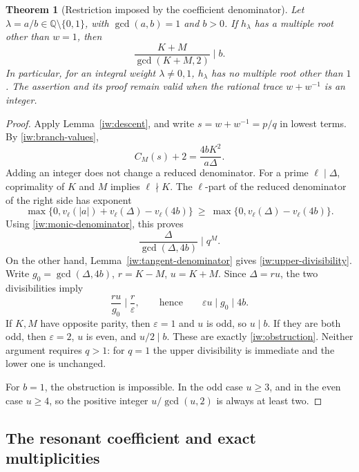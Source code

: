 \documentclass[11pt,a4paper]{article}
\newtheorem{theorem}{Theorem}[section]
\theoremstyle{definition}
\theoremstyle{remark}
\begin{document}
\begin{theorem}[Restriction imposed by the coefficient denominator]
\label{iw:denominator-obstruction}
Let \(\lambda=a/b\in\mathbb Q\setminus\{0,1\}\), with
\(\gcd(a,b)=1\) and \(b>0\). If \(h_\lambda\) has a multiple root
other than \(w=1\), then
\begin{equation}\label{iw:obstruction}
 \boxed{\frac{K+M}{\gcd(K+M,2)}\mid b.}
\end{equation}
In particular, for an integral weight \(\lambda\ne0,1\),
\(h_\lambda\) has no multiple root other than \(1\).
The assertion and its proof remain valid when the rational trace
\(w+w^{-1}\) is an integer.
\end{theorem}

\begin{proof}
Apply Lemma~\ref{iw:descent}, and write \(s=w+w^{-1}=p/q\) in
lowest terms. By \eqref{iw:branch-values},
\[
 C_M(s)+2=\frac{4bK^2}{a\Delta}.
\]
Adding an integer does not change a reduced denominator.
For a prime \(\ell\mid\Delta\), coprimality of \(K\) and \(M\)
implies \(\ell\nmid K\). The \(\ell\)-part of the reduced
denominator of the right side has exponent
\[
 \max\{0,v_\ell(|a|)+v_\ell(\Delta)-v_\ell(4b)\}
 \ \ge\ \max\{0,v_\ell(\Delta)-v_\ell(4b)\}.
\]
Using \eqref{iw:monic-denominator}, this proves
\begin{equation}\label{iw:lower-divisibility}
 \frac{\Delta}{\gcd(\Delta,4b)}\mid q^M.
\end{equation}
On the other hand, Lemma~\ref{iw:tangent-denominator} gives
\eqref{iw:upper-divisibility}. Write
\(g_0=\gcd(\Delta,4b)\), \(r=K-M\), \(u=K+M\). Since \(\Delta=ru\),
the two divisibilities imply
\[
 \frac{ru}{g_0}\mid\frac r\varepsilon,
 \qquad\text{hence}\qquad
 \varepsilon u\mid g_0\mid4b.
\]
If \(K,M\) have opposite parity, then \(\varepsilon=1\) and
\(u\) is odd, so \(u\mid b\). If they are both odd, then
\(\varepsilon=2\), \(u\) is even, and \(u/2\mid b\).
These are exactly \eqref{iw:obstruction}.
Neither argument requires \(q>1\): for \(q=1\) the upper
divisibility is immediate and the lower one is unchanged.

For \(b=1\), the obstruction is impossible. In the odd case
\(u\ge3\), and in the even case \(u\ge4\), so the positive
integer \(u/\gcd(u,2)\) is always at least two.
\end{proof}

\subsection{The resonant coefficient and exact multiplicities}
\end{document}
